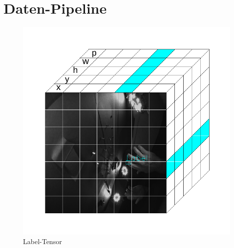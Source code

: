\newpage
\section{Daten-Pipeline}

\begin{figure}	
	\centering
	\includegraphics[width=.8\textwidth]{Kapitel/DatenPipeline/Bilder/LabelTensor.pdf}
	\caption{Label-Tensor}
	\label{img:label_tensor}
\end{figure} 


